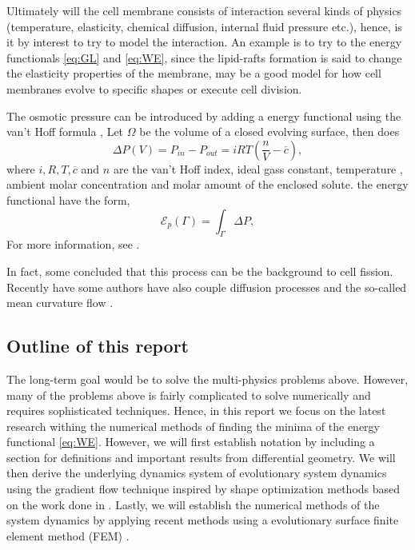 Ultimately will the cell membrane consists of interaction several kinds of physics (temperature, elasticity, chemical diffusion, internal fluid pressure etc.), hence, is it by interest to try to model the interaction. An example is to try to the energy functionals \eqref{eq:GL}  and \eqref{eq:WE}, since the lipid-rafts formation is said to change the elasticity properties of the membrane, may be a good model for how cell membranes evolve to specific shapes or execute cell division.


The osmotic pressure can be introduced by adding a energy functional using the van't Hoff formula ,
Let $\Omega $ be the volume of a closed evolving surface,  then does
\[
\Delta P \left( V \right) = P_{in} - P_{out} = iRT\left( \frac{n}{V} - \overline{c}  \right),
\]
where $i, R, T, \overline{c} $ and $n$ are the van't Hoff index, ideal gass constant, temperature , ambient molar concentration and molar amount of the enclosed solute.  the energy
functional have the form,
\[
\mathcal{E} _{p}\left( \Gamma    \right)  = \int_{\Gamma   }^{   } \Delta P,
\]
For more information, see \cite{zhu2022mem3dg}.

In fact, some concluded that this process can be the background to cell fission.
Recently have some authors have also couple diffusion processes and the so-called mean curvature flow \cite{burger2021interaction, elliott2022numerical}.


\subsection{Outline of this report}%
\label{sub:outline_of_this_report}

The long-term goal would be to solve the multi-physics problems above. However, many of the problems above is fairly complicated to solve numerically and requires sophisticated techniques. Hence, in this report we focus on the latest research withing
the numerical methods of finding the minima of the energy functional \eqref{eq:WE}. However, we will first establish notation by including a section for definitions and important results from differential geometry. We will then derive the
underlying dynamics system of evolutionary system dynamics using the gradient flow technique inspired by shape optimization methods based on the work done in \cite{ dougan2012first}. Lastly, we will establish the numerical methods of the system
dynamics by applying recent methods using a evolutionary surface finite element method (FEM) \cite{kovacs2021convergent, hu2022evolving}.


